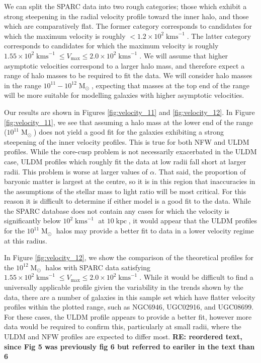 \documentclass[a4paper,11pt]{article}
\newcommand{\re}[1]{{{\bf \color{green} RE: #1}}}
\begin{document}
We can split the SPARC data into two rough categories; those which exhibit a strong steepening in the radial velocity profile toward the inner halo, and those which are comparatively flat. The former category corresponds to candidates for which the maximum velocity is roughly $< 1.2\times 10^2 \operatorname{kms}^{-1}$. The latter category corresponds to candidates for which the maximum velocity is roughly $1.55\times 10^2 \operatorname{kms}^{-1}\leq V_{\mathrm{max}}\leq 2.0\times 10^2 \operatorname{kms}^{-1}$. We will assume that higher asymptotic velocities correspond to a larger halo mass, and therefore expect a range of halo masses to be required to fit the data. We will consider halo masses in the range $10^{11} - 10^{12} \operatorname{M}_{\odot}$, expecting that masses at the top end of the range will be more suitable for modelling galaxies with higher asymptotic velocities. 

Our results are shown in Figures \ref{fig:velocity_11} and \ref{fig:velocity_12}. In Figure \ref{fig:velocity_11}, we see that assuming a halo mass at the lower end of the range ($10^{11}\operatorname{M}_{\odot}$) does not yield a good fit for the galaxies exhibiting a strong steepening of the inner velocity profiles. This is true for both NFW and ULDM profiles. While the core-cusp problem is not necessarily exacerbated in the ULDM case, ULDM profiles which roughly fit the data at low radii fall short at larger radii. This problem is worse at larger values of $\alpha$. That said, the proportion of baryonic matter is largest at the centre, so it is in this region that inaccuracies in the assumptions of the stellar mass to light ratio will be most critical. For this reason it is difficult to determine if either model is a good fit to the data. While the SPARC database does not contain any cases for which the velocity is significantly below $10^2\operatorname{kms}^{-1}$ at $10 \operatorname{kpc}$, it would appear that the ULDM profiles for the $10^{11}\operatorname{M}_{\odot}$ halos may provide a better fit to data in a lower velocity regime at this radius.



In Figure \ref{fig:velocity_12}, we show the comparison of the theoretical profiles for the $10^{12}\operatorname{M}_{\odot}$ halos with SPARC data satisfying $1.55 \times 10^2 \operatorname{kms}^{-1}\leq V_{\mathrm{max}}\leq 2.0 \times 10^2 \operatorname{kms}^{-1}$. While it would be difficult to find a universally applicable profile givien the variability in the trends shown by the data, there are a number of galaxies in this sample set which have flatter velocity profiles within the plotted range, such as NGC6946, UGC02916, and UGC08699. For these cases, the ULDM profile appears to provide a better fit, however more  data would be required to confirm this, particularly at small radii, where the ULDM and NFW profiles are expected to differ most. \re{reordered text, since Fig 5 was previously fig 6 but referred to eariler in the text than 6}
\end{document}
